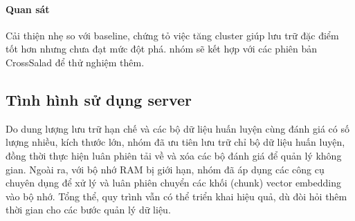 \paragraph{Quan sát}
Cải thiện nhẹ so với baseline, chứng tỏ việc tăng cluster giúp lưu trữ đặc điểm tốt hơn nhưng chưa đạt mức đột phá. nhóm sẽ kết hợp với các phiên bản CrossSalad để thử nghiệm thêm.


\subsection{Tình hình sử dụng server}
Do dung lượng lưu trữ hạn chế và các bộ dữ liệu huấn luyện cùng đánh giá có số lượng nhiều, kích thước lớn, nhóm đã ưu tiên lưu trữ chỉ bộ dữ liệu huấn luyện, đồng thời thực hiện luân phiên tải về và xóa các bộ đánh giá để quản lý không gian. Ngoài ra, với bộ nhớ RAM bị giới hạn, nhóm đã áp dụng các công cụ chuyên dụng để xử lý và luân phiên chuyển các khối (chunk) vector embedding vào bộ nhớ. Tổng thể, quy trình vẫn có thể triển khai hiệu quả, dù đòi hỏi thêm thời gian cho các bước quản lý dữ liệu.
